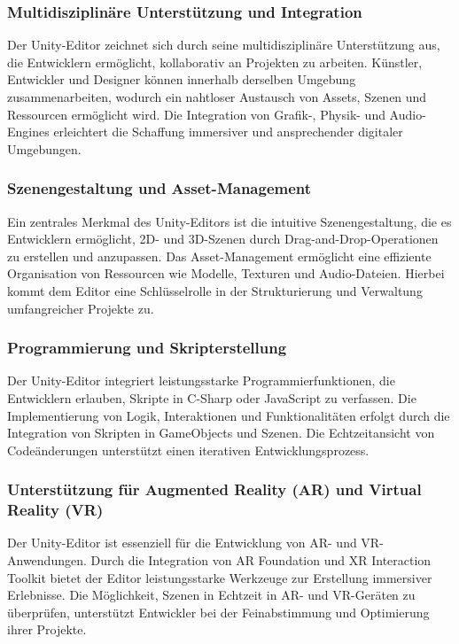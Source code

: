\subsubsection{Multidisziplinäre Unterstützung und Integration}
Der Unity-Editor zeichnet sich durch seine multidisziplinäre Unterstützung aus, die Entwicklern ermöglicht, kollaborativ
an Projekten zu arbeiten. Künstler, Entwickler und Designer können innerhalb derselben Umgebung zusammenarbeiten,
wodurch ein nahtloser Austausch von Assets, Szenen und Ressourcen ermöglicht wird. Die Integration von Grafik-,
Physik- und Audio-Engines erleichtert die Schaffung immersiver und ansprechender digitaler Umgebungen.

\subsubsection{Szenengestaltung und Asset-Management}
Ein zentrales Merkmal des Unity-Editors ist die intuitive Szenengestaltung, die es Entwicklern ermöglicht,
2D- und 3D-Szenen durch Drag-and-Drop-Operationen zu erstellen und anzupassen. Das Asset-Management ermöglicht eine
effiziente Organisation von Ressourcen wie Modelle, Texturen und Audio-Dateien. Hierbei kommt dem Editor eine
Schlüsselrolle in der Strukturierung und Verwaltung umfangreicher Projekte zu.

\subsubsection{Programmierung und Skripterstellung}
Der Unity-Editor integriert leistungsstarke Programmierfunktionen, die Entwicklern erlauben, Skripte in C-Sharp oder
JavaScript zu verfassen. Die Implementierung von Logik, Interaktionen und Funktionalitäten erfolgt durch die
Integration von Skripten in GameObjects und Szenen. Die Echtzeitansicht von Codeänderungen unterstützt einen
iterativen Entwicklungsprozess.

\subsubsection{Unterstützung für Augmented Reality (AR) und Virtual Reality (VR)}
Der Unity-Editor ist essenziell für die Entwicklung von AR- und VR-Anwendungen. Durch die Integration von AR Foundation
und XR Interaction Toolkit bietet der Editor leistungsstarke Werkzeuge zur Erstellung immersiver Erlebnisse. Die
Möglichkeit, Szenen in Echtzeit in AR- und VR-Geräten zu überprüfen, unterstützt Entwickler bei der Feinabstimmung
und Optimierung ihrer Projekte.

